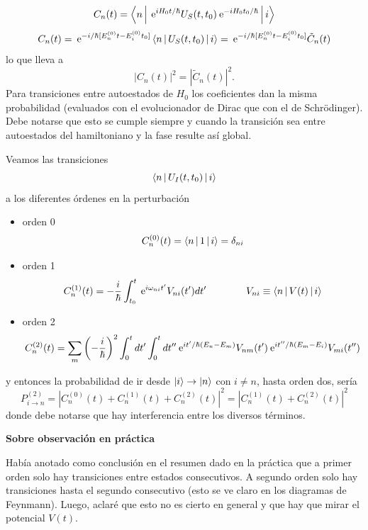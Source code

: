 \documentclass[10pt,oneside]{CBFT_book}
\begin{document}
\[
	C_n(t) = \Braket{n|\:\mathrm{e}^{iH_0t/\hbar} U_S(t,t_0) \:\mathrm{e}^{-iH_0t_0/\hbar}|i}
\]
\[
	C_n(t) = \:\mathrm{e}^{-i/\hbar[E_n^{(0)} t - E_i^{(0)} t_0]} \Braket{n| U_S(t,t_0) |i} =
		\:\mathrm{e}^{-i/\hbar[E_n^{(0)} t - E_i^{(0)} t_0]} \tilde{C}_n(t)
\]
lo que lleva a 
\[
	|C_n(t)|^2 = |\tilde{C}_n(t)|^2.
\]
Para transiciones entre autoestados de $H_0$ los coeficientes dan la misma probabilidad 
(evaluados con el evolucionador de Dirac que con el de Schrödinger).
Debe notarse que esto se cumple siempre y cuando la transición sea entre autoestados del
hamiltoniano y la fase resulte así global.


Veamos las transiciones 
\[
	\Braket{ n | U_I(t,t_0)| i }
\]
a los diferentes órdenes en la perturbación
\begin{itemize}
 \item orden 0
 \[
	C_n^{(0)}(t) = \Braket{n|1|i} = \delta_{ni}
 \]
 \item orden 1
 \[
 	C_n^{(1)}(t) = -\frac{i}{\hbar} \int_{t_0}^t \:\mathrm{e}^{i\omega_{ni} t'} V_{ni}(t') dt' \qquad \qquad 
 	V_{ni} \equiv \Braket{n|V(t)|i}
 \]
 \item orden 2
 \[
 	C_n^{(2)}(t) = \sum_m \left( -\frac{i}{\hbar} \right)^2  \int_{0}^t  dt'\int_{0}^t dt''
 	\:\mathrm{e}^{it'/\hbar(E_n-E_m)} V_{nm}(t') \:\mathrm{e}^{it''/\hbar(E_m-E_i)} V_{mi}(t'')
 \]
\end{itemize}
y entonces la probabilidad de ir desde $\ket{i} \to \Ket{n}$ con $i\neq n$, hasta orden dos, sería
\[
	P^{(2)}_{i\to n} = |C_n^{(0)}(t)+C_n^{(1)}(t)+C_n^{(2)}(t)|^2 =
	| C_n^{(1)}(t) + C_n^{(2)}(t) |^2
\]
donde debe notarse que hay interferencia entre los diversos términos.

\begin{ejemplo}{\bf Sobre observación en práctica}

Había anotado como conclusión en el resumen dado en la práctica que a primer orden solo hay transiciones
entre estados consecutivos. A segundo orden solo hay transiciones hasta el segundo consecutivo (esto se
ve claro en los diagramas de Feynmann).
Luego, aclaré que esto no es cierto en general y que hay que mirar el potencial $V(t)$.
 
\end{ejemplo}
\end{document}
